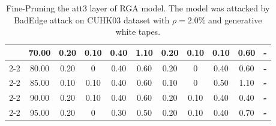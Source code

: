 \begin{table}[htbp]
\begin{minipage}[b]{0.49\linewidth}
{\begin{tabular}{ccccccccccc}
\multicolumn{1}{c|}{} & \multicolumn{1}{c|}{70.00} & 0.20 & 0.10 & 0.40 & \multicolumn{1}{c|}{1.10} & 0.20 & 0.10 & 0.10 & 0.60 & \textbf{-} \\ \cline{2-2}
\multicolumn{1}{c|}{} & \multicolumn{1}{c|}{80.00} & 0.20 & 0 & 0.40 & \multicolumn{1}{c|}{0.60} & 0.20 & 0 & 0.40 & 0.60 & \textbf{-} \\ \cline{2-2}
\multicolumn{1}{c|}{} & \multicolumn{1}{c|}{85.00} & 0.10 & 0.10 & 0.40 & \multicolumn{1}{c|}{0.60} & 0.10 & 0 & 0.50 & 1.10 & \textbf{-}  \\ \cline{2-2}
\multicolumn{1}{c|}{} & \multicolumn{1}{c|}{90.00} & 0.20 & 0.10 & 0.40 & \multicolumn{1}{c|}{0.60} & 0.20 & 0.10 & 0.40 & 0.40 & \textbf{-} \\ \cline{2-2}
\multicolumn{1}{c|}{} & \multicolumn{1}{c|}{95.00} & 0.20 & 0 & 0.30 & \multicolumn{1}{c|}{0.50} & 0.20 & 0.10 & 0.40 & 0.70 & \textbf{-} \\ \bottomrule
\end{tabular}}
  \caption{Fine-Pruning the att3 layer of RGA model. The model was attacked by BadEdge attack on CUHK03 dataset with $\rho=2.0\%$ and generative white tapes. }
  \label{tab:Fine-pruning att3 layer}
\end{minipage}
\hfill
\begin{minipage}[b]{0.49\linewidth}
  \centering
\end{minipage}
\end{table}
